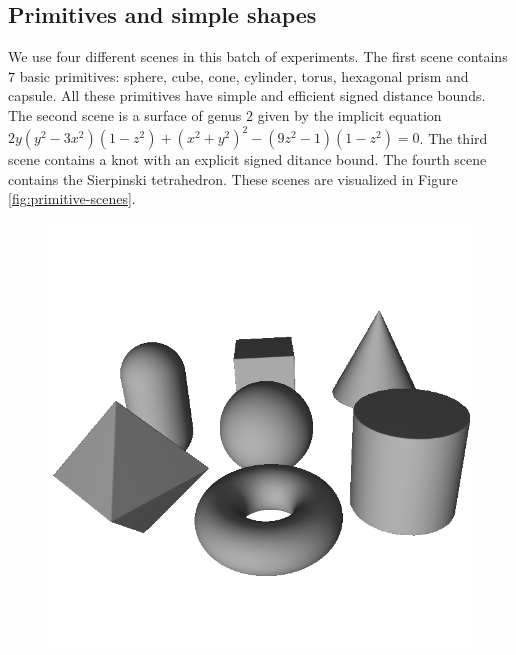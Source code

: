 \documentclass[11pt,twocolumn]{article}
\begin{document}
		\subsection{Primitives and simple shapes}\label{sec:experiments-primitive}
		We use four different scenes in this batch of experiments.
		The first scene contains $7$ basic primitives:
		sphere, cube, cone, cylinder, torus, hexagonal prism and capsule.
		All these primitives have simple and efficient signed distance bounds.
		The second scene is a surface of genus $2$ given by the implicit equation
		$2y(y^2-3x^2)(1-z^2) + (x^2 + y^2)^2 - (9z^2 - 1)(1-z^2)=0$.
		The third scene contains a knot with an explicit signed ditance bound.
		The fourth scene contains the Sierpinski tetrahedron.
		These scenes are visualized in Figure \ref{fig:primitive-scenes}.
		\begin{figure}
			\centering
			\resizebox{0.5\textwidth}{!}
			{
				\includegraphics{primitives.png}
}
\end{figure}
\end{document}
